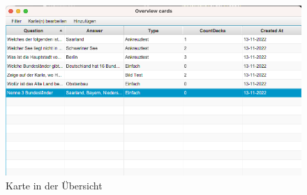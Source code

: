 \documentclass[fontsize=12pt,paper=a4,twoside]{scrartcl}
\begin{document}
\begin{figure}[h!]
	\caption{Karte in der Übersicht}
	\label{fig:cards-4}
	\includegraphics[width=\textwidth]{cards-4.png}
\end{figure}
\end{document}
